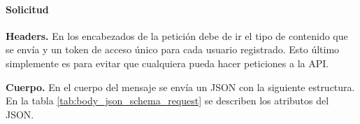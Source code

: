 \paragraph{Solicitud}
\label{\detokenize{chapter_two/desc_cloudnao:peticion}}

\textbf{Headers.}
\label{\detokenize{chapter_two/desc_cloudnao:headers}}
En los encabezados de la petición debe de ir el tipo de contenido que se envía
y un token de acceso único para cada usuario registrado. Esto último
simplemente es para evitar que cualquiera pueda hacer peticiones a la API.

\begin{sphinxVerbatim}[commandchars=\\\{\}]
 
 
\end{sphinxVerbatim}


\textbf{Cuerpo.}
\label{\detokenize{chapter_two/desc_cloudnao:body}}
En el cuerpo del mensaje se envía un JSON con la siguiente estructura. En la tabla 
\ref{tab:body_json_schema_request} se describen los atributos del JSON.

\begin{sphinxVerbatim}[commandchars=\\\{\}]
   
   
   \PYG{p}{[}
              
  \PYG{p}{]}{\PYGZcb{}}
\end{sphinxVerbatim}


